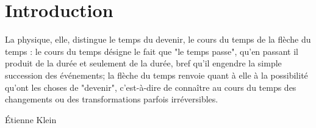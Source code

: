 \chapter*{Introduction}

\epigraph{La physique, elle, distingue le temps du devenir, le cours du temps de la flèche du temps : le cours du temps désigne le fait que "le temps passe", qu'en passant il produit de la durée et seulement de la durée, bref qu'il engendre la simple succession des événements; la flèche du temps renvoie quant à elle à la possibilité qu'ont les choses de "devenir", c'est-à-dire de connaître au cours du temps des changements ou des transformations parfois irréversibles.}{Étienne Klein}

\blindtext[2]

\blindtext
